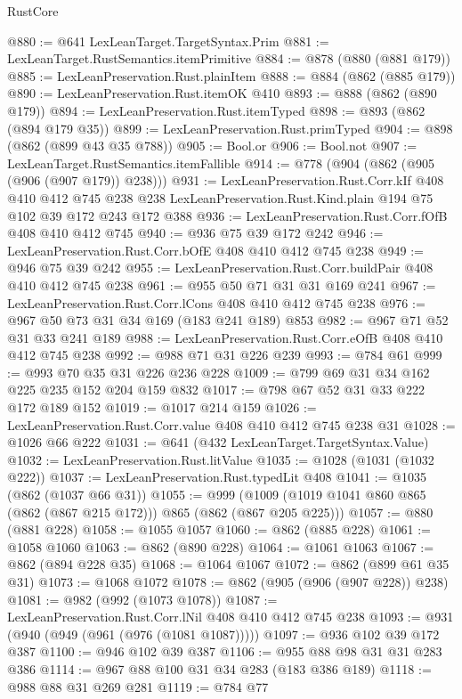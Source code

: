 \begin{lexlean}{RustCore}
\begin{coremodule}
@880 := @641 LexLeanTarget.TargetSyntax.Prim
@881 := LexLeanTarget.RustSemantics.itemPrimitive
@884 := @878 (@880 (@881 @179))
@885 := LexLeanPreservation.Rust.plainItem
@888 := @884 (@862 (@885 @179))
@890 := LexLeanPreservation.Rust.itemOK @410
@893 := @888 (@862 (@890 @179))
@894 := LexLeanPreservation.Rust.itemTyped
@898 := @893 (@862 (@894 @179 @35))
@899 := LexLeanPreservation.Rust.primTyped
@904 := @898 (@862 (@899 @43 @35 @788))
@905 := Bool.or
@906 := Bool.not
@907 := LexLeanTarget.RustSemantics.itemFallible
@914 := @778 (@904 (@862 (@905 (@906 (@907 @179)) @238)))
@931 := LexLeanPreservation.Rust.Corr.kIf
    @408
    @410
    @412
    @745
    @238
    @238
    LexLeanPreservation.Rust.Kind.plain
    @194
    @75
    @102
    @39
    @172
    @243
    @172
    @388
@936 := LexLeanPreservation.Rust.Corr.fOfB @408 @410 @412 @745
@940 := @936 @75 @39 @172 @242
@946 := LexLeanPreservation.Rust.Corr.bOfE @408 @410 @412 @745 @238
@949 := @946 @75 @39 @242
@955 := LexLeanPreservation.Rust.Corr.buildPair @408 @410 @412 @745 @238
@961 := @955 @50 @71 @31 @31 @169 @241
@967 := LexLeanPreservation.Rust.Corr.lCons @408 @410 @412 @745 @238
@976 := @967 @50 @73 @31 @34 @169 (@183 @241 @189) @853
@982 := @967 @71 @52 @31 @33 @241 @189
@988 := LexLeanPreservation.Rust.Corr.eOfB @408 @410 @412 @745 @238
@992 := @988 @71 @31 @226 @239
@993 := @784 @61
@999 := @993 @70 @35 @31 @226 @236 @228
@1009 := @799 @69 @31 @34 @162 @225 @235 @152 @204 @159 @832
@1017 := @798 @67 @52 @31 @33 @222 @172 @189 @152
@1019 := @1017 @214 @159
@1026 := LexLeanPreservation.Rust.Corr.value @408 @410 @412 @745 @238 @31
@1028 := @1026 @66 @222
@1031 := @641 (@432 LexLeanTarget.TargetSyntax.Value)
@1032 := LexLeanPreservation.Rust.litValue
@1035 := @1028 (@1031 (@1032 @222))
@1037 := LexLeanPreservation.Rust.typedLit @408
@1041 := @1035 (@862 (@1037 @66 @31))
@1055 := @999 (@1009 (@1019 @1041 @860 @865 (@862 (@867 @215 @172))) @865 (@862 (@867 @205 @225)))
@1057 := @880 (@881 @228)
@1058 := @1055 @1057
@1060 := @862 (@885 @228)
@1061 := @1058 @1060
@1063 := @862 (@890 @228)
@1064 := @1061 @1063
@1067 := @862 (@894 @228 @35)
@1068 := @1064 @1067
@1072 := @862 (@899 @61 @35 @31)
@1073 := @1068 @1072
@1078 := @862 (@905 (@906 (@907 @228)) @238)
@1081 := @982 (@992 (@1073 @1078))
@1087 := LexLeanPreservation.Rust.Corr.lNil @408 @410 @412 @745 @238
@1093 := @931 (@940 (@949 (@961 (@976 (@1081 @1087)))))
@1097 := @936 @102 @39 @172 @387
@1100 := @946 @102 @39 @387
@1106 := @955 @88 @98 @31 @31 @283 @386
@1114 := @967 @88 @100 @31 @34 @283 (@183 @386 @189)
@1118 := @988 @88 @31 @269 @281
@1119 := @784 @77

\end{coremodule}
\end{lexlean}
